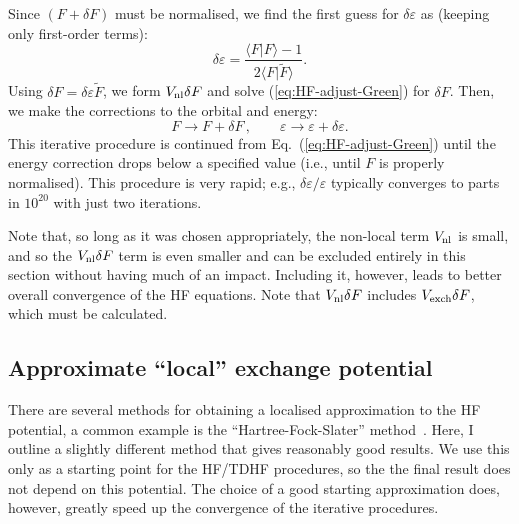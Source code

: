 \documentclass[10pt,twocolumn,a4paper]{article}%
\newcommand{\braket}[1]{\ensuremath{\langle #1\rangle}}	%
\newcommand{\be}{\begin{equation}}
\newcommand{\ee}{\end{equation}}
\def\en{\ensuremath{\varepsilon}}
\begin{document}
Since $(F+\delta F)$ must be normalised, we find the first guess for $\delta \en$ as (keeping only first-order terms):
\be
\delta \en = \frac{\braket{F|F} - 1}{2\braket{F|\tilde F}}.
\ee
Using  $\delta F = \delta\en\tilde F$, we form $V_{\rm nl} \delta F$ and solve (\ref{eq:HF-adjust-Green}) for $\delta F$.
Then, we make the corrections to the orbital and energy:
\be
F\to F+\delta F \, , \qquad \en\to\en + \delta\en.
\ee
This iterative procedure is continued from Eq.~(\ref{eq:HF-adjust-Green}) until the energy correction drops below a specified value
(i.e., until $F$ is properly normalised).
This procedure is very rapid; e.g., $\delta\en/\en$ typically converges to parts in $10^{20}$ with just two iterations.

Note that, so long as it was chosen appropriately, the non-local term $V_{\rm nl}$ is small, and so the $V_{\rm nl}\delta F$ term is even smaller and can be excluded entirely in this section without having much of an impact.
Including it, however, leads to better overall convergence of the HF equations.
Note that $V_{\rm nl} \delta F$ includes $V_{\rm exch} \delta F$, which must be calculated.







\subsection{Approximate ``local'' exchange potential}\label{sec:hf-approx}


There are several methods for obtaining a localised approximation to the HF potential, a common  example is the ``Hartree-Fock-Slater'' method~\cite{Slater1951}.
%
Here, I outline a slightly different method %
that gives reasonably good results.
We use this only as a starting point for the HF/TDHF procedures, so the the final result does not depend on this potential.
The choice of a good starting approximation does, however, greatly speed up the convergence of the iterative procedures.
\end{document}
